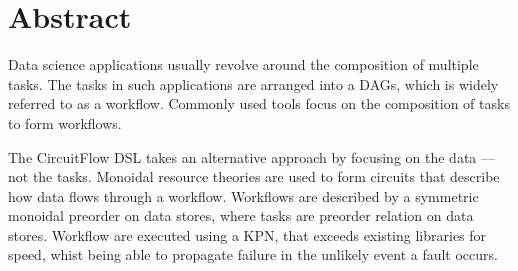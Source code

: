 \documentclass[dissertation.tex]{subfiles}
\begin{document}
\chapter*{Abstract}\label{chap:abstract}

Data science applications usually revolve around the composition of multiple tasks.
The tasks in such applications are arranged into a \acfp{DAG}, which is widely referred to as a workflow.
Commonly used tools focus on the composition of tasks to form workflows.

The CircuitFlow \ac{DSL} takes an alternative approach by focusing on the data --- not the tasks.
Monoidal resource theories are used to form circuits that describe how data flows through a workflow.
Workflows are described by a symmetric monoidal preorder on data stores, where tasks are preorder relation on data stores.
Workflow are executed using a \acf{KPN}, that exceeds existing libraries for speed, whist being able to propagate failure in the unlikely event a fault occurs.








\end{document}
